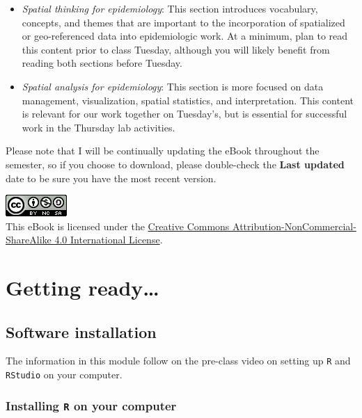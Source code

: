 \documentclass[
]{book}
\providecommand{\tightlist}{%
  \setlength{\itemsep}{0pt}\setlength{\parskip}{0pt}}
\begin{document}
\begin{itemize}
\tightlist
\item
  \emph{Spatial thinking for epidemiology}: This section introduces vocabulary, concepts, and themes that are important to the incorporation of spatialized or geo-referenced data into epidemiologic work. At a minimum, plan to read this content prior to class Tuesday, although you will likely benefit from reading both sections before Tuesday.
\item
  \emph{Spatial analysis for epidemiology}: This section is more focused on data management, visualization, spatial statistics, and interpretation. This content is relevant for our work together on Tuesday's, but is essential for successful work in the Thursday lab activities.
\end{itemize}

Please note that I will be continually updating the eBook throughout the semester, so if you choose to download, please double-check the \textbf{Last updated} date to be sure you have the most recent version.

\includegraphics{images/by-nc-sa.png}\\
This eBook is licensed under the \href{http://creativecommons.org/licenses/by-nc-sa/4.0/}{Creative Commons Attribution-NonCommercial-ShareAlike 4.0 International License}.

\hypertarget{part-getting-ready}{%
\part{Getting ready\ldots{}}\label{part-getting-ready}}

\hypertarget{software-installation}{%
\chapter*{Software installation}\label{software-installation}}

The information in this module follow on the pre-class video on setting up \texttt{R} and \texttt{RStudio} on your computer.

\hypertarget{installing-r-on-your-computer}{%
\section*{\texorpdfstring{Installing \texttt{R} on your computer}{Installing R on your computer}}\label{installing-r-on-your-computer}}
\end{document}
